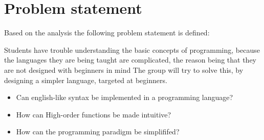 \newpage
\section{Problem statement}
Based on the analysis the following problem statement is defined:
\begin{center}
	Students have trouble understanding the basic concepts of programming, because the languages they are being taught are complicated, the reason being that they are not designed with beginners in mind
	The group will try to solve this, by designing a simpler language, targeted at beginners.

\begin{itemize}
	\item Can english-like syntax be implemented in a programming language?
	\item How can High-order functions be made intuitive?
	\item How can the programming paradigm be simplififed?
\end{itemize}
\end{center}

